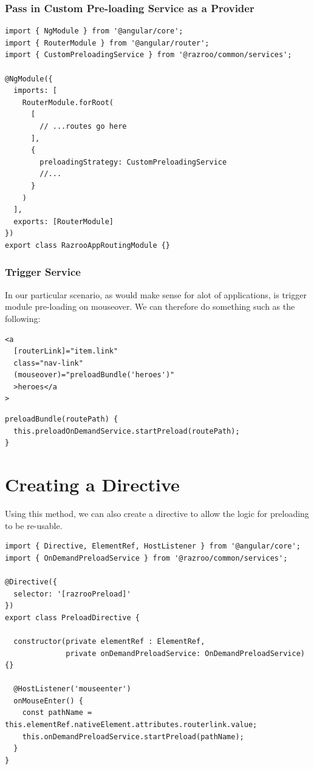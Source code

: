 \subsubsection{Pass in Custom Pre-loading Service as a Provider}
\begin{lstlisting}[caption=app.routing.module.ts]
import { NgModule } from '@angular/core';
import { RouterModule } from '@angular/router';
import { CustomPreloadingService } from '@razroo/common/services';

@NgModule({
  imports: [
    RouterModule.forRoot(
      [
        // ...routes go here
      ],
      {
        preloadingStrategy: CustomPreloadingService
        //...
      }
    )
  ],
  exports: [RouterModule]
})
export class RazrooAppRoutingModule {}
\end{lstlisting}

\subsubsection{Trigger Service}
In our particular scenario, as would make sense for alot of applications, is trigger 
module pre-loading on mouseover. We can therefore do something such as the following: 
\begin{lstlisting}
<a
  [routerLink]="item.link"
  class="nav-link"
  (mouseover)="preloadBundle('heroes')"
  >heroes</a
>  
\end{lstlisting}

\begin{lstlisting}
preloadBundle(routePath) {
  this.preloadOnDemandService.startPreload(routePath);
}
\end{lstlisting}

\section{Creating a Directive}
Using this method, we can also create a directive to allow the logic for 
preloading to be re-usable. 

\begin{lstlisting}[caption=preload.directive.ts]
import { Directive, ElementRef, HostListener } from '@angular/core';
import { OnDemandPreloadService } from '@razroo/common/services';

@Directive({
  selector: '[razrooPreload]'
})
export class PreloadDirective {

  constructor(private elementRef : ElementRef,
              private onDemandPreloadService: OnDemandPreloadService) {}

  @HostListener('mouseenter')
  onMouseEnter() {
    const pathName = this.elementRef.nativeElement.attributes.routerlink.value;
    this.onDemandPreloadService.startPreload(pathName);
  }
}
\end{lstlisting}

